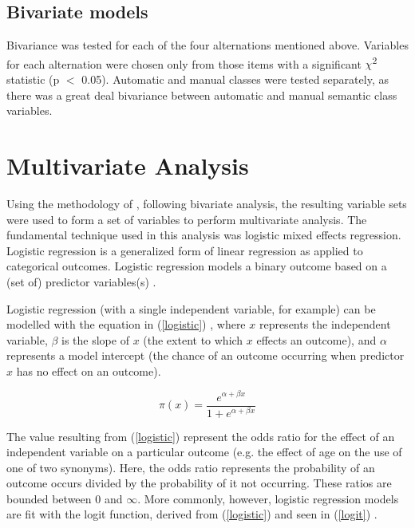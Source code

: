 \subsection{Bivariate models}

 Bivariance was tested for each of the four alternations mentioned above. Variables for each alternation were chosen only from those items with a significant $\chi$\textsuperscript{2} statistic (p $<$ 0.05). Automatic and manual classes were tested separately, as there was a great deal bivariance between automatic and manual semantic class variables. 

\section{Multivariate Analysis}

Using the methodology of \citet{arppe2008univariate}, following bivariate analysis, the resulting variable sets were used to form a set of variables to perform multivariate analysis. The fundamental technique used in this analysis was logistic mixed effects regression. Logistic regression is a generalized form of linear regression as applied to categorical outcomes. Logistic regression models a binary outcome based on a (set of) predictor variables(s)  \citep[163]{agresti2013categorical}. 

Logistic regression (with a single independent variable, for example) can be modelled with the equation in (\ref{logistic}) \citep[163]{agresti2013categorical}, where $x$ represents the independent variable, $\beta$ is the slope of $x$ (the extent to which $x$ effects an outcome), and $\alpha$ represents a model intercept (the chance of an outcome occurring when predictor $x$ has no effect on an outcome).

\begin{equation}
\pi(x) = \frac{e^{\alpha + \beta x}}{1+e^{\alpha + \beta x}}
\label{logistic}
\end{equation}


The value resulting from (\ref{logistic}) represent the odds ratio for the effect of an independent variable on a particular outcome (e.g. the effect of age on the use of one of two synonyms). Here, the odds ratio represents the probability of an outcome occurs divided by the probability of it not occurring. These ratios are bounded between 0 and $\infty$. More commonly, however, logistic regression models are fit with the logit function, derived from (\ref{logistic}) and seen in (\ref{logit}) \citep[163]{agresti2013categorical}. 

